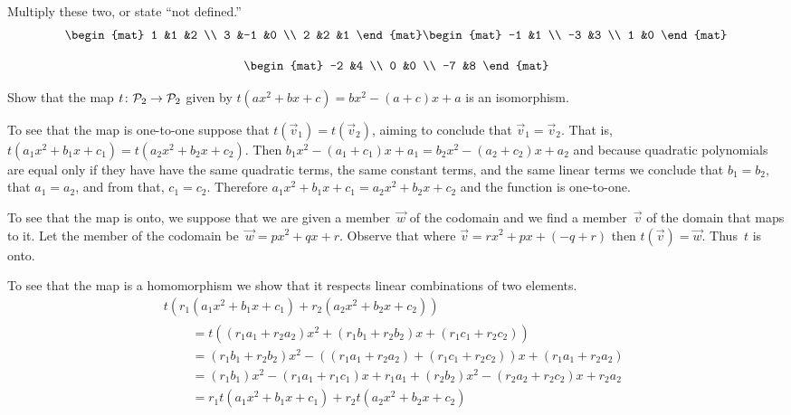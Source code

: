 \documentclass[11pt]{examjh}
\begin{document}
\begin{questions}
\question
Multiply these two, or state ``not defined.''
\begin{equation*}
  \begin{mat}
    1 &1  &2 \\
    3 &-1 &0 \\
    2 &2  &1
  \end{mat}
  \begin{mat}
    -1 &1 \\
    -3 &3 \\
     1 &0
  \end{mat}
\end{equation*}
\begin{solution}[1in]
  \begin{equation*}
    \begin{mat}
      -2 &4 \\
       0 &0 \\
      -7 &8
    \end{mat}
  \end{equation*}
\end{solution}


\question
Show that the map $\mbox{$t\colon \mathcal{P}_2\to \mathcal{P}_2$}$ given by
$t(ax^2+bx+c)=bx^2-(a+c)x+a$ is an isomorphism.
\begin{solution}[2.5in]
To see that the map is one-to-one suppose that $t(\vec{v}_1)=t(\vec{v}_2)$,
aiming to conclude that $\vec{v}_1=\vec{v}_2$.
That is, $t(a_1x^2+b_1x+c_1)=t(a_2x^2+b_2x+c_2)$.
Then $b_1x^2-(a_1+c_1)x+a_1=b_2x^2-(a_2+c_2)x+a_2$ and because 
quadratic polynomials
are equal only if they have have the same quadratic terms, the same constant
terms, and the same linear terms we conclude that 
$b_1=b_2$, that $a_1=a_2$, and from that, $c_1=c_2$.
Therefore $a_1x^2+b_1x+c_1=a_2x^2+b_2x+c_2$ and the function is 
one-to-one.

To see that the map is onto, we suppose that we are given a member~$\vec{w}$ 
of the codomain and we find a member~$\vec{v}$ of the domain that maps to
it.
Let the member of the codomain be~$\vec{w}=px^2+qx+r$.
Observe that where $\vec{v}=rx^2+px+(-q+r)$ then $t(\vec{v})=\vec{w}$.
Thus~$t$ is onto.  

To see that the map is a homomorphism we show that it respects linear 
combinations of two elements.
\begin{multline*}
  t(r_1(a_1x^2+b_1x+c_1)+r_2(a_2x^2+b_2x+c_2))              \\ 
  \begin{split} \quad 
  &=t((r_1a_1+r_2a_2)x^2+(r_1b_1+r_2b_2)x+(r_1c_1+r_2c_2))   \\
  &=(r_1b_1+r_2b_2)x^2-((r_1a_1+r_2a_2)+(r_1c_1+r_2c_2))x+(r_1a_1+r_2a_2)  \\
  &=(r_1b_1)x^2-(r_1a_1+r_1c_1)x+r_1a_1
     +(r_2b_2)x^2-(r_2a_2+r_2c_2)x+r_2a_2                       \\
  &=r_1t(a_1x^2+b_1x+c_1)+r_2t(a_2x^2+b_2x+c_2)
  \end{split}
\end{multline*}
\end{solution}




\end{questions}
\end{document}
